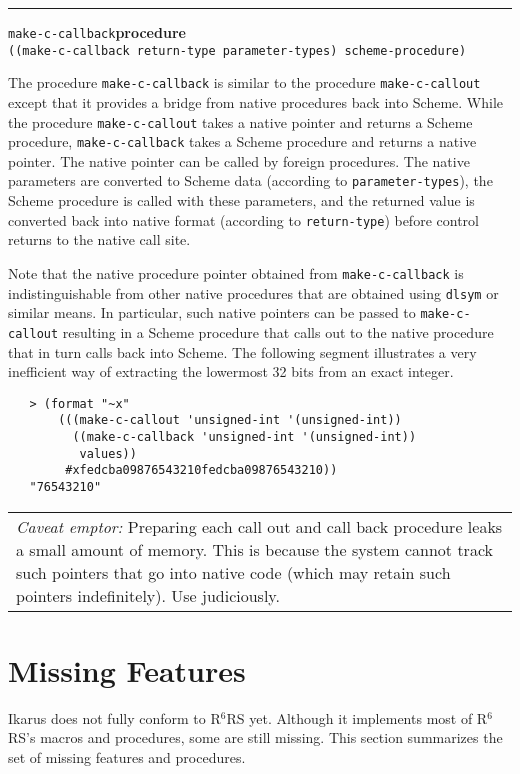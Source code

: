 \documentclass[onecolumn, 12pt, twoside, openright, dvipdfm]{book}
\makeatletter
\newcommand{\rnrs}[1]{R$^{\mathrm{#1}}$RS}
\newcommand{\BoxedText}[2]{
  \vspace{.05in}
  \begin{center}
    \begin{tabular}{|p{4.6in}|} {\large \emph{#1}} #2 \end{tabular}
  \end{center}
  \vspace{.05in}
}
\newcommand{\idxlabeldefun}[5]{
\vspace{1ex}
\rule{\textwidth}{2pt}
{\phantomsection\index{#1@\texttt{#2}}\label{#3}{\Large\texttt{#4}}\hfill\textbf{#5}}\\}
\newcommand{\idxdefun}[3]{\idxlabeldefun{#1}{#2}{#1}{#2}{#3}}
\newcommand{\defun}[2]{\idxdefun{#1}{#1}{#2}}
\makeatother
\begin{document}
\defun{make-c-callback}{procedure}
\texttt{((make-c-callback return-type parameter-types) scheme-procedure)}

The procedure \texttt{make-c-callback} is similar to the procedure
\texttt{make-c-callout} except that it provides a bridge from native
procedures back into Scheme.  While the procedure
\texttt{make-c-callout} takes a native pointer and returns a Scheme
procedure, \texttt{make-c-callback} takes a Scheme procedure and
returns a native pointer.  The native pointer can be called by
foreign procedures.  The native parameters are converted to Scheme
data (according to \texttt{parameter-types}), the Scheme procedure
is called with these parameters, and the returned value is converted
back into native format (according to \texttt{return-type}) before
control returns to the native call site.


Note that the native procedure pointer obtained from
\texttt{make-c-callback} is indistinguishable from other native
procedures that are obtained using \texttt{dlsym} or similar means.
In particular, such native pointers can be passed to
\texttt{make-c-callout} resulting in a Scheme procedure that calls out
to the native procedure that in turn calls back into Scheme.  The
following segment illustrates a very inefficient way of extracting
the lowermost 32 bits from an exact integer.

\begin{verbatim}
   > (format "~x"
       (((make-c-callout 'unsigned-int '(unsigned-int))
         ((make-c-callback 'unsigned-int '(unsigned-int)) 
          values))
        #xfedcba09876543210fedcba09876543210))
   "76543210"
\end{verbatim}

\BoxedText{Caveat emptor:}{Preparing each call out and call back
procedure leaks a small amount of memory.  This is because the
system cannot track such pointers that go into native code
(which may retain such pointers indefinitely).  Use judiciously.}

\chapter{Missing Features}

Ikarus does not fully conform to \rnrs{6} yet.  Although it
implements most of \rnrs{6}'s macros and procedures, some are still
missing.  This section summarizes the set of missing features and
procedures.
\end{document}
